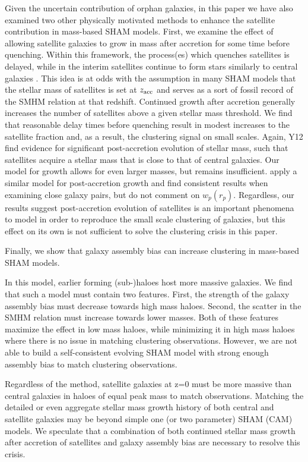 \documentclass[a4paper,fleqn,usenatbib]{mnras}
\begin{document}
Given the uncertain contribution of orphan galaxies, in this paper we have also examined two other physically motivated methods to enhance the satellite contribution in mass-based SHAM models.  First, we examine the effect of allowing satellite galaxies to grow in mass after accretion for some time before quenching.  Within this framework, the process(es) which quenches satellites is delayed, while in the interim satellites continue to form stars similarly to central galaxies \citep{Wetzel:2013dw}.  This idea is at odds with the assumption in many SHAM models that the stellar mass of satellites is set at $z_{\rm acc}$ and serves as a sort of fossil record of the SMHM relation at that redshift.  Continued growth after accretion generally increases the number of satellites above a given stellar mass threshold.  We find that reasonable delay times before quenching result in modest increases to the satellite fraction and, as a result, the clustering signal on small scales.  Again, Y12 find evidence for significant post-accretion evolution of stellar mass, such that satellites acquire a stellar mass that is close to that of central galaxies.  Our model for growth allows for even larger masses, but remains insufficient.  \citep{Behroozi:2015wx} apply a similar model for post-accretion growth and find consistent results when examining close galaxy pairs, but do not comment on $w_p(r_p)$.  Regardless, our results suggest post-accretion evolution of satellites is an important phenomena to model in order to reproduce the small scale clustering of galaxies, but this effect on its own is not sufficient to solve the clustering crisis in this paper.           

Finally, we show that galaxy assembly bias can increase clustering in mass-based SHAM models.

    In this model, earlier forming (sub-)haloes host more massive galaxies.  We find that such a model must contain two features.  First, the strength of the galaxy assembly bias must decrease towards high mass haloes.  Second, the scatter in the SMHM relation must increase towards lower masses.  Both of these features maximize the effect in low mass haloes, while minimizing it in high mass haloes where there is no issue in matching clustering observations.  However, we are not able to build a self-consistent evolving SHAM model with strong enough assembly bias to match clustering observations.

Regardless of the method, satellite galaxies at z=0 must be more massive than central galaxies in haloes of equal peak mass to match observations.  Matching the detailed or even aggregate stellar mass growth history of both central and satellite galaxies may be beyond simple one (or two parameter) SHAM (CAM) models.  We speculate that a combination of both continued stellar mass growth after accretion of satellites and galaxy assembly bias are necessary to resolve this crisis.
\end{document}
